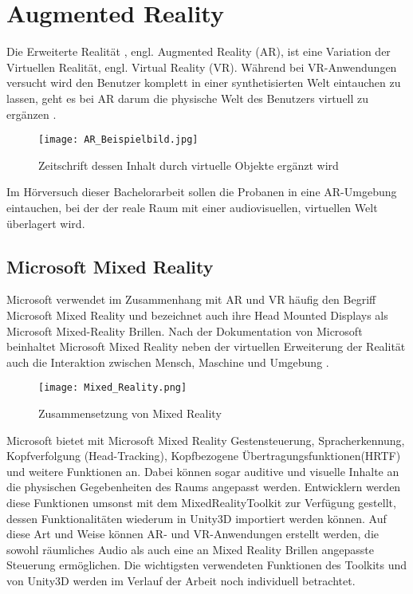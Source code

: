  \section{Augmented Reality}
Die Erweiterte Realität , engl. Augmented Reality (AR), ist eine Variation der Virtuellen Realität, engl. Virtual Reality (VR). Während bei VR-Anwendungen versucht wird den Benutzer komplett in einer synthetisierten Welt eintauchen zu lassen, geht es bei AR darum die physische Welt des Benutzers virtuell zu ergänzen \cite{Azura97}. \\

\begin{figure}[H]
\centering
\texttt{[image: AR\_Beispielbild.jpg]}
\caption{Zeitschrift dessen Inhalt durch virtuelle Objekte ergänzt wird}
\label{fig:AR_Beispielbild}
\end{figure}

Im Hörversuch dieser Bachelorarbeit sollen die Probanen in eine AR-Umgebung eintauchen, bei der der reale Raum mit einer audiovisuellen, virtuellen Welt überlagert wird. 

\subsection{Microsoft Mixed Reality}
Microsoft verwendet im Zusammenhang mit AR und VR häufig den Begriff Microsoft Mixed Reality und bezeichnet auch ihre Head Mounted Displays als Microsoft Mixed-Reality Brillen. Nach der Dokumentation von Microsoft  beinhaltet Microsoft Mixed Reality neben der virtuellen Erweiterung der Realität auch die Interaktion zwischen Mensch, Maschine und Umgebung \cite{MicrosoftMR}. 


\begin{figure}[H]
\centering
\texttt{[image: Mixed\_Reality.png]}
\caption{Zusammensetzung von Mixed Reality}
\label{fig:Mixed_Reality}
\end{figure}
 
Microsoft bietet mit Microsoft Mixed Reality Gestensteuerung, Spracherkennung, Kopfverfolgung (Head-Tracking), Kopfbezogene Übertragungsfunktionen(HRTF) und weitere Funktionen an. Dabei können sogar auditive und visuelle Inhalte an die physischen Gegebenheiten des Raums angepasst werden. Entwicklern werden diese Funktionen umsonst mit dem MixedRealityToolkit zur Verfügung gestellt, dessen Funktionalitäten wiederum in Unity3D importiert werden können. Auf diese Art und Weise können AR- und VR-Anwendungen erstellt werden, die sowohl räumliches Audio als auch eine an Mixed Reality Brillen angepasste Steuerung ermöglichen. Die wichtigsten verwendeten Funktionen des Toolkits und von Unity3D werden im Verlauf der Arbeit noch individuell betrachtet.


